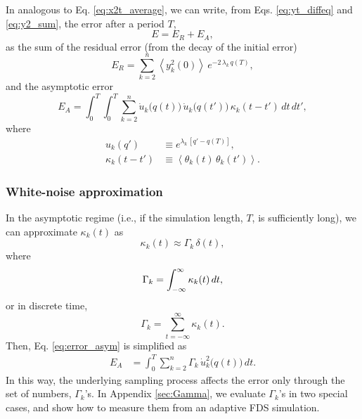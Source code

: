 \documentclass[reprint, floatfix]{revtex4-1}
\newcommand{\Err}{E}
\begin{document}
In analogous to Eq. \eqref{eq:x2t_average},
we can write,
from Eqs. \eqref{eq:yt_diffeq} and \eqref{eq:y2_sum},
the error after a period $T$,
%
\begin{equation}
  \Err
  =
  \Err_R + \Err_A,
  \label{eq:error_split}
\end{equation}
%
as the sum of the residual error
(from the decay of the initial error)
%
\begin{equation}
  \Err_R
  =
  \sum_{k = 2}^n
    \left\langle y_k^2(0) \right\rangle \,
    e^{ - 2 \, \lambda_k  \, q(T) },
  \label{eq:error_res}
\end{equation}
%
and the asymptotic error
\begin{equation}
  \Err_A
  =
  \int_0^T \int_0^T
  \sum_{k = 2}^n
    \dot u_k\bigl( q(t) \bigr) \,
    \dot u_k\bigl( q(t') \bigr) \,
    \kappa_k(t - t') \, dt \, dt',
  \label{eq:error_asym}
\end{equation}
%
where
\begin{align*}
  u_k(q')
  &\equiv
  e^{\lambda_k \, [q' - q(T)]},
  \\
  \kappa_k(t - t')
  &\equiv
  \left\langle
    \theta_k(t) \, \theta_k(t')
  \right\rangle.
\end{align*}



\subsubsection{White-noise approximation}



In the asymptotic regime
(i.e., if the simulation length, $T$, is sufficiently long),
we can approximate $\kappa_k(t)$ as
%
\begin{equation}
  \kappa_k(t) \approx \Gamma_k \, \delta(t)
  ,
\label{eq:kappa_delta}
\end{equation}
%
where
\begin{equation}
  \Gamma_k = \int_{-\infty}^\infty \kappa_k(t) \, dt,
  \notag
\end{equation}
or in discrete time,
\begin{equation}
  \Gamma_k = \sum_{t = -\infty}^\infty \kappa_k(t).
  \label{eq:Gamma_sum}
\end{equation}
%
Then, Eq. \eqref{eq:error_asym} is simplified as
%
\begin{align}
  \Err_A
  &=
  \int_0^T
  \sum_{k = 2}^n
  \Gamma_k \, \dot u_k^2\bigl( q(t) \bigr) \, dt.
\label{eq:error_asym1}
\end{align}
%
In this way,
the underlying sampling process
affects the error only through the set of numbers,
$\Gamma_k$'s.
%
In Appendix \ref{sec:Gamma},
we evaluate $\Gamma_k$'s in two special cases,
and show how to measure them
from an adaptive FDS simulation.
\end{document}
